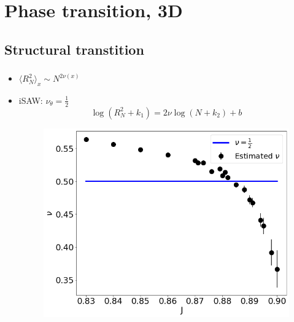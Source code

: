 \documentclass{beamer}
\begin{document}
\section{Phase transition, 3D }
\subsection{Structural transtition }

\begin{frame} 
	\frametitle{\insertsection}
	\framesubtitle{\insertsubsection}
	\begin{minipage}{0.48\linewidth}
		\begin{itemize} 
			
			\item $ \langle R_N^2 \rangle_x \sim N^{2 \nu(x)}  $
			\item iSAW: $\nu_{\theta} = \frac{1}{2}$
			\begin{equation*}
			\label{berettiscale}
			\log (R_N^2+k_1 ) = 2 \nu \log (N+k_2) + b
			\end{equation*}
			
			\begin{figure}[h]
				\centering
				\includegraphics[scale=0.1822]{3_nu_shortchains_deep.png} 
				
			\end{figure}
		\end{itemize} 
		

\end{minipage}
\end{frame}
\end{document}
